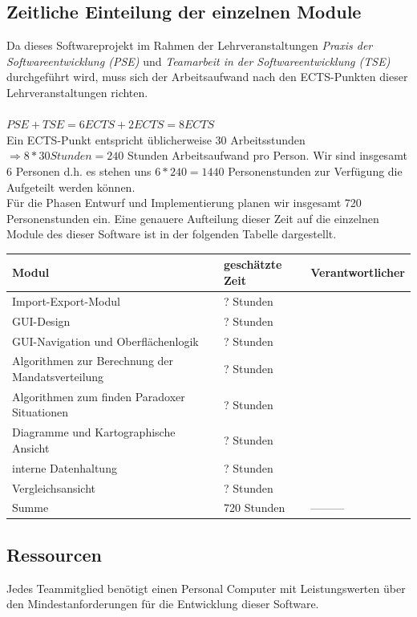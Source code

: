 \documentclass[10pt,a4paper]{article}
\begin{document}
\subsection{Zeitliche Einteilung der einzelnen Module}
Da dieses Softwareprojekt im Rahmen der Lehrveranstaltungen \textit{Praxis der Softwareentwicklung (PSE)} und \textit{Teamarbeit in der Softwareentwicklung (TSE)} durchgeführt wird, muss sich der Arbeitsaufwand nach den ECTS-Punkten dieser Lehrveranstaltungen richten.\\\\
$PSE + TSE = 6 ECTS + 2 ECTS = 8 ECTS$\\
Ein ECTS-Punkt entspricht üblicherweise 30 Arbeitsstunden $\Rightarrow 8 * 30 Stunden = 240$ Stunden Arbeitsaufwand pro Person. Wir sind insgesamt 6 Personen d.h. es stehen uns $6 * 240 = 1440$ Personenstunden zur Verfügung die Aufgeteilt werden können.\\
Für die Phasen Entwurf und Implementierung planen wir insgesamt 720 Personenstunden ein. Eine genauere Aufteilung dieser Zeit auf die einzelnen Module des dieser Software ist in der folgenden Tabelle dargestellt.\\

\begin{tabular}[h]{lll}
	\hline
	\textbf{Modul} & \textbf{geschätzte Zeit} & \textbf{Verantwortlicher} \\
	\hline
	Import-Export-Modul & ? Stunden &  \\
	GUI-Design & ? Stunden &  \\
	GUI-Navigation und Oberflächenlogik & ? Stunden &  \\
	Algorithmen zur Berechnung der Mandatsverteilung & ? Stunden &  \\
	Algorithmen zum finden Paradoxer Situationen  & ? Stunden &  \\
	Diagramme und Kartographische Ansicht  & ? Stunden &  \\
	interne Datenhaltung  & ? Stunden &  \\
	Vergleichsansicht & ? Stunden &  \\
	\hline
	Summe & 720 Stunden & --------- \\
	\hline
\end{tabular}

\subsection{Ressourcen}
Jedes Teammitglied benötigt einen Personal Computer mit Leistungswerten über den Mindestanforderungen für die Entwicklung dieser Software.
\end{document}
